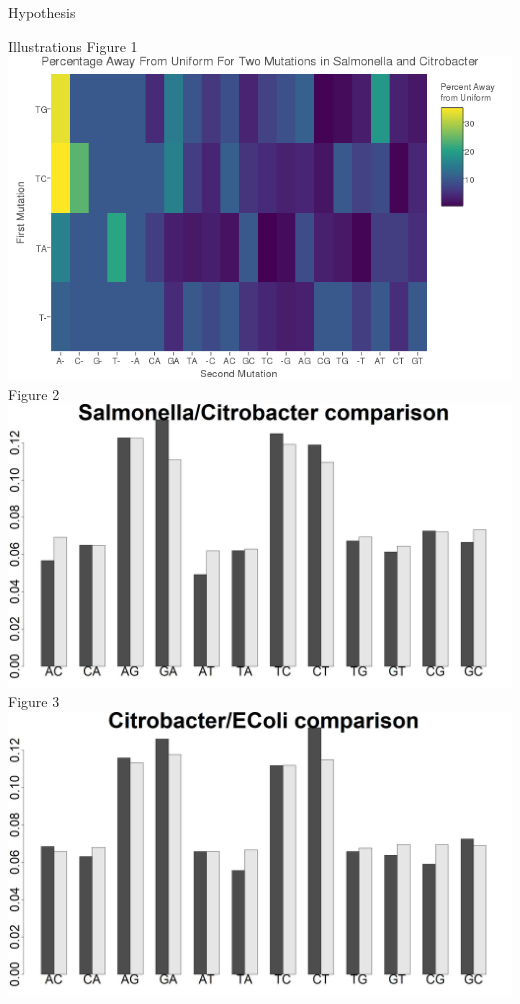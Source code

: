 \documentclass[final]{beamer}
\begin{document}
\begin{frame}{}
\begin{columns}[t]
\begin{column}{.32 \linewidth}
\begin{block}{\large Hypothesis}
			\end{block}
			\begin{block}{\large Illustrations}
				Figure 1
				\newline
				\includegraphics[scale = 1.5]{FinalPlotMaybe.jpg}
				\newline
				Figure 2
				\includegraphics[scale = .455]{CBSalPercentage.jpeg}
				\newline
				Figure 3
				\includegraphics[scale = .455]{CBECPercentage.jpeg}
				

\end{block}
\end{column}
\end{columns}
\end{frame}
\end{document}
